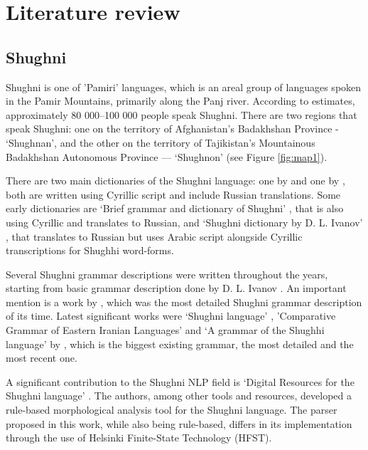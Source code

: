 \section{Literature review}
\subsection{Shughni}
\par Shughni is one of 'Pamiri' languages, which is an areal group of languages spoken in the Pamir Mountains, primarily along the Panj river. According to \textcite{edelman_dodykhudoeva_shughni_2009} estimates, approximately 80 000--100 000 people speak Shughni.  There are two regions that speak Shughni: one on the territory of Afghanistan's Badakhshan Province - `Shughnan', and the other on the territory of Tajikistan's Mountainous Badakhshan Autonomous Province --- `Shughnon' \parencite[2]{parker_shughni_2023} (see Figure \ref{fig:map1}).
\par There are two main dictionaries of the Shughni language: one by \textcite{zarubin_dict_1960} and one by \textcite{karamshoev_dict_1988}, both are written using Cyrillic script and include Russian translations. Some early dictionaries are `Brief grammar and dictionary of Shughni' \parencite{tumanovich_gram_1906}, that is also using Cyrillic and translates to Russian, and `Shughni dictionary by D. L. Ivanov' \parencite{salemann_dict_1895}, that translates to Russian but uses Arabic script alongside Cyrillic transcriptions for Shughhi word-forms.
\par Several Shughni grammar descriptions were written throughout the years, starting from basic grammar description done by D. L. Ivanov \parencite[274-281]{salemann_dict_1895}. An important mention is a work by \textcite{karamshoev_dialect_1963}, which was the most detailed Shughni grammar description of its time. Latest significant works were `Shughni language' \parencite[225-242]{edelman_languages_1999}, 'Comparative Grammar of Eastern Iranian Languages' \parencite{edelman_gram_2009} and `A grammar of the Shughhi language' by \textcite{parker_shughni_2023}, which is the biggest existing grammar, the most detailed and the most recent one.
\par A significant contribution to the Shughni NLP field is `Digital Resources for the Shughni language' \parencite{makarov_digital_2022}. The authors, among other tools and resources, developed a rule-based morphological analysis tool for the Shughni language. The parser proposed in this work, while also being rule-based, differs in its implementation through the use of Helsinki Finite-State Technology (HFST).

